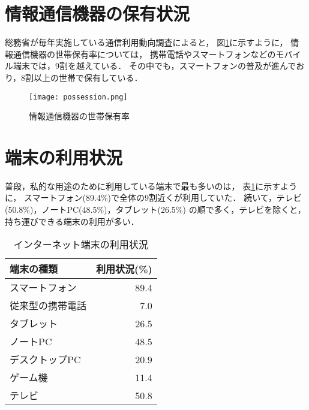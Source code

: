 \documentclass[a4paper,11pt,dvipdfmx]{ujarticle}
\title{}
\author{G58490-2025 村上 瑛士}
\begin{document}
\maketitle

\section{情報通信機器の保有状況}

総務省が毎年実施している通信利用動向調査\cite{soumu}によると，
図\ref{fig:保有率}に示すように，
情報通信機器の世帯保有率については，
携帯電話やスマートフォンなどのモバイル端末では，9割を越えている．
その中でも，スマートフォンの普及が進んでおり，8割以上の世帯で保有している．

\begin{figure}[htbp]
    \centering
    \texttt{[image: possession.png]}
    \caption{情報通信機器の世帯保有率}\label{fig:保有率}
\end{figure}

\section{端末の利用状況}

普段，私的な用途のために利用している端末で最も多いのは，
表\ref{tbl:利用状況}に示すように，
スマートフォン(89.4\%)で全体の9割近くが利用していた．
続いて，テレビ(50.8\%)，ノートPC(48.5\%)，タブレット(26.5\%)
の順で多く，テレビを除くと，持ち運びできる端末の利用が多い\cite{corona}．

\begin{table}[htbp]
    \centering
    \caption{インターネット端末の利用状況}
    \label{tbl:利用状況}

    \begin{tabular}{|l|r|}\hline
        端末の種類 & 利用状況(\%) \\
        \hline
        スマートフォン & 89.4 \\
        \hline
        従来型の携帯電話 & 7.0 \\
        \hline
        タブレット & 26.5 \\
        \hline
        ノートPC & 48.5 \\
        \hline
        デスクトップPC & 20.9 \\
        \hline
        ゲーム機 & 11.4 \\
        \hline 
        テレビ & 50.8 \\
        \hline
    \end{tabular}
\end{table}
\end{document}
